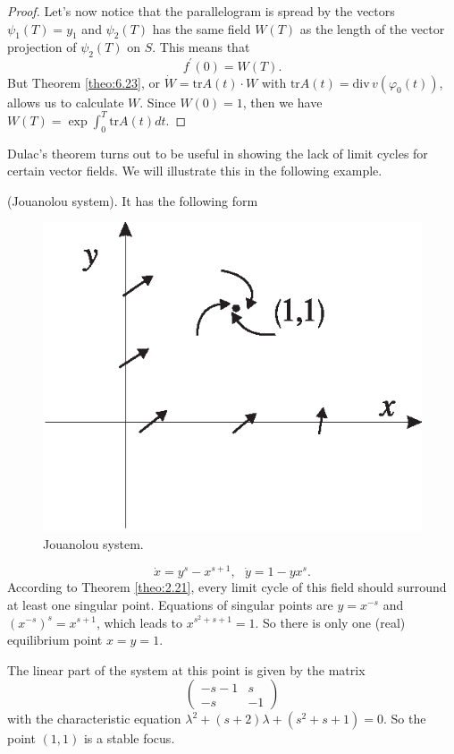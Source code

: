 \begin{theorem}
\begin{proof}
		Let's now notice that the parallelogram is spread by the vectors $ \psi _ {1} (T) = y_ {1} $ and $ \psi _ {2} (T) $ has the same field $ W (T) $ as the length of the vector projection of $ \psi _ {2} (T) $ on $ S $. This means that
		$$
		f^{\prime }(0)=W(T).
		$$
		But Theorem \ref{theo:6.23}, or $\dot{W}=\textrm{tr}A(t)\cdot W$ with $\textrm{tr}%
		A(t)=\textrm{div}\,v(\varphi _{0}(t))$, allows us to calculate $ W $. Since $ W (0) = 1 $, then we have $ W (T) = \exp \int_ {0} ^ {T} \textrm {tr} A (t) dt $.
	\end{proof}
\end{theorem}

Dulac's theorem turns out to be useful in showing the lack of limit cycles for certain vector fields. We will illustrate this in the following example.

\begin{example} (Jouanolou system).
	It has the following form	
	\begin{figure}[!ht]
		\centering
		\includegraphics [scale=1.3]{jtr213}
		\caption{Jouanolou system.}
		\label{fig:2.13}
	\end{figure}
	$$
	\dot{x}=y^{s}-x^{s+1},\text{ \ \ }\dot{y}=1-yx^{s}.
	$$
	According to Theorem \ref{theo:2.21}, every limit cycle of this field should surround at least one singular point. Equations of singular points are $y=x^{-s}$ and $\left( x^{-s}\right) ^{s}=x^{s+1}$, which leads to $ x ^ {s ^ {2} + s + 1} = 1$. So there is only one (real) equilibrium point $ x = y = 1. $
	
	The linear part of the system at this point is given by the matrix
	$$
	\left(
	\begin{array}{cc}
	-s-1 & s \\
	-s & -1%
	\end{array}%
	\right)
	$$
	with the characteristic equation $\lambda ^{2}+(s+2)\lambda
	+(s^{2}+s+1)=0. $ So the point $ \left (1,1 \right) $ is a stable focus.
	

\end{example}
